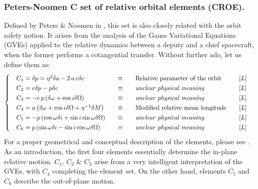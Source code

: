 	\subsubsection{Peters-Noomen C set of relative orbital elements (CROE).}
	\indent Defined by Peters \& Noomen in \cite{Peters_Noomen}, this set is also closely related with the orbit safety notion. It arises from the analysis of the Gauss Variational Equations (GVEs) applied to the relative dynamics between a deputy and a chief spacecraft, when the former performs a cotangential transfer. Without further ado, let us define them as:
	\begin{equation}
	\arraycolsep=10pt
	\def\arraystretch{1.3}
	\left\{\begin{array}{llll}
	C_1 = \delta p = \eta^2 \delta a - 2\, a \, e \delta e  & \equiv & \text{Relative parameter of the orbit} &  [L] \\
	C_2 = e\delta p - p \delta e & \equiv  & \text{\textit{unclear physical meaning}}  &  [L] \\
	C_3 = -e\, p \left(\delta \omega + \cos i \delta \Omega\right)& \equiv  & \text{\textit{unclear physical meaning}} &  [L] \\
	C_4 = a \left( \delta\omega + \cos i \delta \Omega + \eta^{-1} \delta M\right)& \equiv  & \text{Modified relative mean longitude}  & [L]  \\
	C_5 = -p\left( \cos\omega \delta i + \sin i \sin\omega \delta \Omega \right)&  \equiv  & \text{\textit{unclear physical meaning}} &  [L] \\
	C_6 = p\left( \sin\omega \delta i - \sin i \cos \omega \delta \Omega \right)&  \equiv  & \text{\textit{unclear physical meaning}} &  [L] \\
	\end{array}\right.
	\end{equation}
	\indent For a proper geometrical and conceptual description of the elements, please see \cite{Peters_Noomen}. As an introduction, the first four elements essentially determine the in-plane relative motion. $C_1$, $C_2$ \& $C_3$ arise from a very intelligent interpretation of the GVEs, with $C_4$ completing the element set. On the other hand, elements $C_5$ and $C_6$ describe the out-of-plane motion.
	
%

